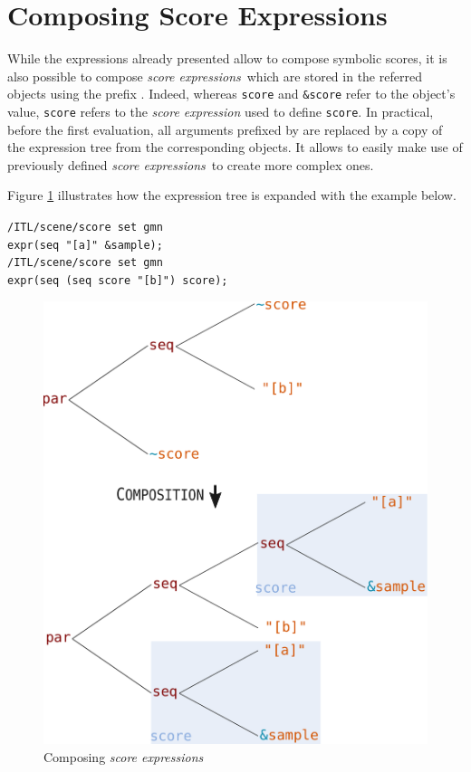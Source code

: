 \documentclass{article}
\newcommand{\OSC}[1]{\texttt{#1}}
\newcommand{\oper}[1]{\textcolor{figRed}{#1}}
\newcommand{\param}[1]{\textcolor{figOrange}{#1}}
\newcommand{\prefix}[1]{\textcolor{figBlue}{#1}}
\newcommand{\sExpr}{\emph{score expressions}}
\newcommand{\lowTilde}{\texttildelow}
\newcommand{\tab}{\hspace*{4mm}}
\newcommand{\sample}	[1]			{\vspace{-0.2em}\begin{center}\colorbox{mygrey}{\begin{minipage}[t]{0.95\columnwidth} {\small \texttt{#1}}\end{minipage}}\end{center}}
\begin{document}
\section{Composing Score Expressions}
\label{composingExpr}
While the expressions already presented allow to compose symbolic scores, it is also possible to compose \sExpr\ which are stored in the referred objects using the prefix \OSC{\prefix{\lowTilde}}. Indeed, whereas \OSC{\param{score}} and \OSC{\prefix{\&}\param{score}} refer to the object's value, \OSC{\prefix{\lowTilde}\param{score}} refers to the \emph{score expression} used to define \OSC{score}. In practical, before the first evaluation, all arguments prefixed by \OSC{\prefix{\lowTilde}} are replaced by a copy of the expression tree from the corresponding objects.
It allows to easily make use of previously defined \sExpr\ to create more complex ones. 

Figure \ref{fig:expandingTree} illustrates how the expression tree is expanded with the example below.

\sample{/ITL/scene/score set gmn\\
\tab expr(\oper{seq} \param{"[a]"} \prefix{\&}\param{sample});\\
/ITL/scene/score set gmn  \\
\tab expr(\oper{seq} (\oper{seq} \prefix{\lowTilde}\param{score} \param{"[b]"}) \prefix{\lowTilde}\param{score});
}

\begin{figure}[th]
\centering
\includegraphics[width=0.9\columnwidth]{imgs/expandingTree}
\caption{Composing \sExpr
\label{fig:expandingTree}}
\end{figure}
\end{document}
